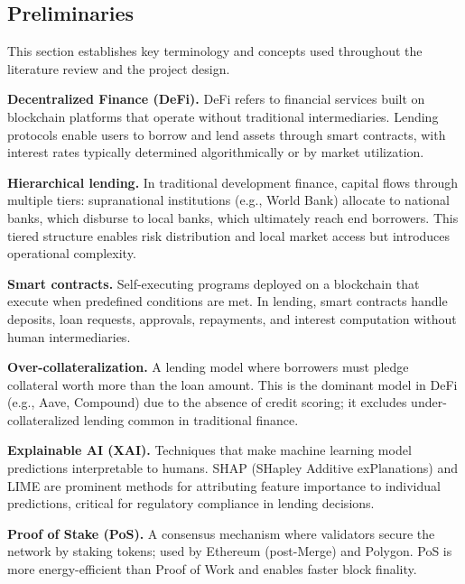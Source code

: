 \documentclass[11pt,a4paper]{article}
\begin{document}
\begin{doublespacing}

\subsection{Preliminaries}

This section establishes key terminology and concepts used throughout the literature review and the project design.

\hangindent=0.5in \textbf{Decentralized Finance (DeFi).} DeFi refers to financial services built on blockchain platforms that operate without traditional intermediaries. Lending protocols enable users to borrow and lend assets through smart contracts, with interest rates typically determined algorithmically or by market utilization.

\hangindent=0.5in \textbf{Hierarchical lending.} In traditional development finance, capital flows through multiple tiers: supranational institutions (e.g., World Bank) allocate to national banks, which disburse to local banks, which ultimately reach end borrowers. This tiered structure enables risk distribution and local market access but introduces operational complexity.

\hangindent=0.5in \textbf{Smart contracts.} Self-executing programs deployed on a blockchain that execute when predefined conditions are met. In lending, smart contracts handle deposits, loan requests, approvals, repayments, and interest computation without human intermediaries.

\hangindent=0.5in \textbf{Over-collateralization.} A lending model where borrowers must pledge collateral worth more than the loan amount. This is the dominant model in DeFi (e.g., Aave, Compound) due to the absence of credit scoring; it excludes under-collateralized lending common in traditional finance.

\hangindent=0.5in \textbf{Explainable AI (XAI).} Techniques that make machine learning model predictions interpretable to humans. SHAP (SHapley Additive exPlanations) and LIME are prominent methods for attributing feature importance to individual predictions, critical for regulatory compliance in lending decisions.

\hangindent=0.5in \textbf{Proof of Stake (PoS).} A consensus mechanism where validators secure the network by staking tokens; used by Ethereum (post-Merge) and Polygon. PoS is more energy-efficient than Proof of Work and enables faster block finality.


\end{doublespacing}
\end{document}
